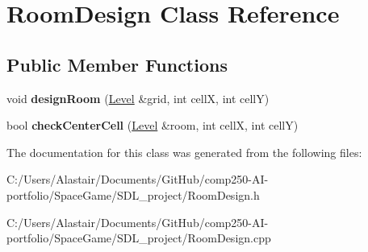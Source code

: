 \hypertarget{class_room_design}{}\section{Room\+Design Class Reference}
\label{class_room_design}
\subsection*{Public Member Functions}
\begin{DoxyCompactItemize}
\item 
\mbox{\label{class_room_design_a78f5ebaf5ec49ea9648a59e9b29738ac}} 
void {\bfseries design\+Room} (\hyperlink{class_level}{Level} \&grid, int cellX, int cellY)
\item 
\mbox{\label{class_room_design_a5f0cd01b980f0b624626c34e197c1de2}} 
bool {\bfseries check\+Center\+Cell} (\hyperlink{class_level}{Level} \&room, int cellX, int cellY)
\end{DoxyCompactItemize}


The documentation for this class was generated from the following files\+:\begin{DoxyCompactItemize}
\item 
C\+:/\+Users/\+Alastair/\+Documents/\+Git\+Hub/comp250-\/\+A\+I-\/portfolio/\+Space\+Game/\+S\+D\+L\+\_\+project/Room\+Design.\+h\item 
C\+:/\+Users/\+Alastair/\+Documents/\+Git\+Hub/comp250-\/\+A\+I-\/portfolio/\+Space\+Game/\+S\+D\+L\+\_\+project/Room\+Design.\+cpp\end{DoxyCompactItemize}
